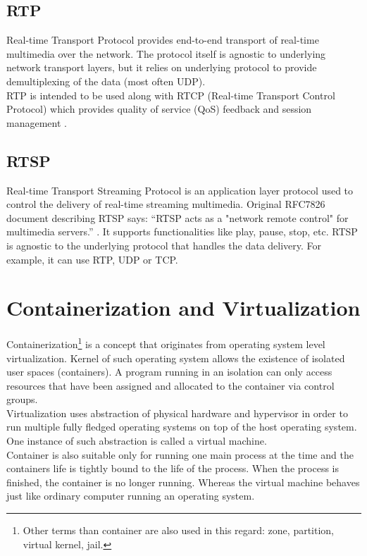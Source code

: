 \documentclass[thesis=M,english]{FITthesis}[2019/03/06]
\begin{document}
\subsection{RTP}
Real-time Transport Protocol provides end-to-end transport of real-time multimedia over the network. The protocol itself is agnostic to underlying network transport layers, but it relies on underlying protocol to provide demultiplexing of the data (most often UDP).\\ RTP is intended to be used along with RTCP (Real-time Transport Control Protocol) which provides quality of service (QoS) feedback and session management \cite{jain-rtp}.

\subsection{RTSP}
Real-time Transport Streaming Protocol is an application layer protocol used to control the delivery of real-time streaming multimedia. Original RFC7826 document describing RTSP says: \enquote{RTSP acts as a
"network remote control" for multimedia servers.} \cite{rtsp-rfc}. It supports functionalities like play, pause, stop, etc. RTSP is agnostic to the underlying protocol that handles the data delivery. For example, it can use RTP, UDP or TCP.

\section{Containerization and Virtualization}
Containerization\footnote{Other terms than container are also used in this regard: zone, partition, virtual kernel, jail. } is a concept that originates from operating system level virtualization. Kernel of such operating system allows the existence of isolated user spaces (containers). A program running in an isolation can only access resources that have been assigned and allocated to the container via control groups.\\

Virtualization uses abstraction of physical hardware and hypervisor in order to run multiple fully fledged operating systems on top of the host operating system. One instance of such abstraction is called a virtual machine. \\

Container is also suitable only for running one main process at the time and the containers life is tightly bound to the life of the process. When the process is finished, the container is no longer running. Whereas the virtual machine behaves just like ordinary computer running an operating system.
\end{document}
